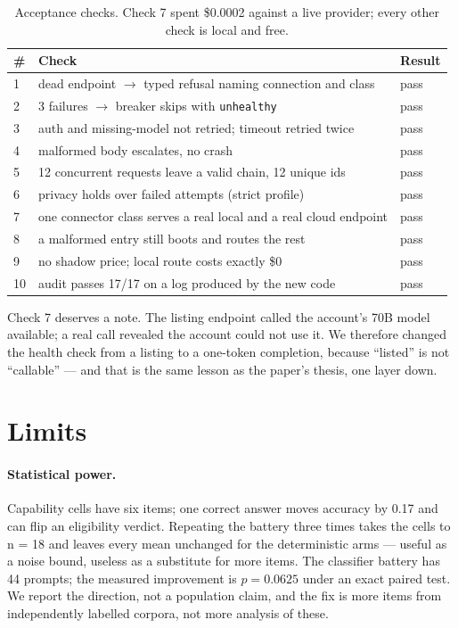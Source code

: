 \documentclass[11pt]{article}
\newcommand{\code}[1]{\texttt{#1}}
\begin{document}
\begin{table}[h]
\centering
\small
\begin{tabular}{@{}p{}p{}p{}@{}}
\toprule
\# & Check & Result \\
\midrule
1 & dead endpoint $\rightarrow$ typed refusal naming connection and class & pass \\
2 & 3 failures $\rightarrow$ breaker skips with \code{unhealthy} & pass \\
3 & auth and missing-model not retried; timeout retried twice & pass \\
4 & malformed body escalates, no crash & pass \\
5 & 12 concurrent requests leave a valid chain, 12 unique ids & pass \\
6 & privacy holds over failed attempts (strict profile) & pass \\
7 & one connector class serves a real local and a real cloud endpoint & pass \\
8 & a malformed entry still boots and routes the rest & pass \\
9 & no shadow price; local route costs exactly \$0 & pass \\
10 & audit passes 17/17 on a log produced by the new code & pass \\
\bottomrule
\end{tabular}
\caption{Acceptance checks. Check 7 spent \$0.0002 against a live provider; every other check is
local and free.}
\label{tab:accept}
\end{table}

Check 7 deserves a note. The listing endpoint called the account's 70B model available; a real
call revealed the account could not use it. We therefore changed the health check from a listing
to a one-token completion, because ``listed'' is not ``callable'' --- and that is the same lesson
as the paper's thesis, one layer down.

\section{Limits}
\label{sec:limits}

\paragraph{Statistical power.} Capability cells have six items; one correct answer moves accuracy
by 0.17 and can flip an eligibility verdict. Repeating the battery three times takes the cells to
n = 18 and leaves every mean unchanged for the deterministic arms --- useful as a noise bound,
useless as a substitute for more items. The classifier battery has 44 prompts; the measured
improvement is $p=0.0625$ under an exact paired test. We report the direction, not a population
claim, and the fix is more items from independently labelled corpora, not more analysis of these.
\end{document}
